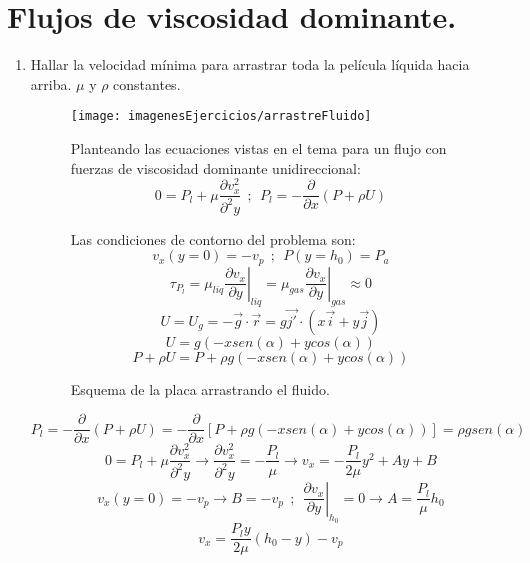 \section{Flujos de viscosidad dominante.}
\begin{enumerate}
	\item Hallar la velocidad mínima para arrastrar toda la película líquida hacia arriba. $\mu$ y $\rho$ constantes.
	\begin{figure}[H]
		\begin{minipage}{0.45\textwidth}
		\centering
		\texttt{[image: imagenesEjercicios/arrastreFluido]}
		\caption{Esquema de la placa arrastrando el fluido.}
		\label{fig:arrastrefluido}
	\end{minipage}%
	\begin{minipage}{0.55\textwidth}
	\blue
	Planteando las ecuaciones vistas en el tema para un flujo con fuerzas de viscosidad dominante unidireccional:
	\[0=P_l+\mu\dfrac{\partial v_x^2}{\partial^2 y}\ \ ; \ \ P_l=-\dfrac{\partial }{\partial x}\left(P+\rho U \right)\]
	
	Las condiciones de contorno del problema son:
	\[v_x(y=0)=-v_p \ \ ; \ \ P(y=h_0)=P_a\]
	\[ \tau_{P_{l}}=\mu_{liq} \left. \dfrac{\partial v_x}{\partial y} \right|_{liq} =\mu_{gas} \left. \dfrac{\partial v_x}{\partial y} \right|_{gas} \approx 0\]
	\[U=U_g=-\vec{g}\cdot \vec{r}=g\vec{j'}\cdot
	\left(x\vec{i}+y\vec{j}\right)\]
	\[U= g\left(-x sen(\alpha)+ycos(\alpha)\right)\]
	\[P+\rho U=P+\rho g\left(-x sen(\alpha)+ycos(\alpha)\right)\]
	\end{minipage}
	\end{figure}
	\blue
	\[P_l=-\dfrac{\partial }{\partial x}\left(P+\rho U\right)=
	-\dfrac{\partial }{\partial x}\left[P+\rho g\left(-x sen(\alpha)+ycos(\alpha)\right)\right]=\rho gsen(\alpha)\]	
	\[0=P_l+\mu\dfrac{\partial v_x^2}{\partial^2 y}\rightarrow \dfrac{\partial v_x^2}{\partial^2 y}=-\dfrac{P_l}{\mu}\rightarrow v_x=-\dfrac{P_l}{2\mu}y^2+Ay+B\]
	\[v_x(y=0)=-v_p\rightarrow B=-v_p \ \ ; \ \ \left. \dfrac{\partial v_x}{\partial y} \right|_{h_0}=0 \rightarrow A=\dfrac{P_l}{\mu}h_0\]
	\[v_x=\dfrac{P_l y}{2\mu}\left(h_0-y\right)-v_p\]
	

\end{enumerate}
